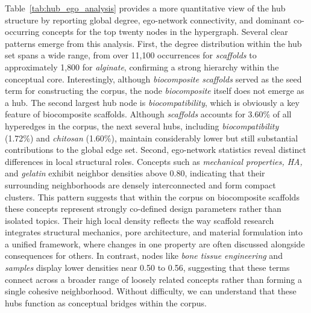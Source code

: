 \documentclass{article}
\begin{document}
Table~\ref{tab:hub_ego_analysis} provides a more quantitative view of the hub structure by reporting global degree, ego-network connectivity, and dominant co-occurring concepts for the top twenty nodes in the hypergraph. Several clear patterns emerge from this analysis. First, the degree distribution within the hub set spans a wide range, from over 11{,}100 occurrences for \textit{scaffolds} to approximately 1{,}800 for \textit{alginate}, confirming a strong hierarchy within the conceptual core. Interestingly, although \textit{biocomposite scaffolds} served as the seed term for constructing the corpus, the node \textit{biocomposite} itself does not emerge as a hub. The second largest hub node is \textit{biocompatibility}, which is obviously a key feature of biocomposite scaffolds. Although \textit{scaffolds} accounts for 3.60\% of all hyperedges in the corpus, the next several hubs, including \textit{biocompatibility} (1.72\%) and \textit{chitosan} (1.60\%), maintain considerably lower but still substantial contributions to the global edge set. Second, ego-network statistics reveal distinct differences in local structural roles. Concepts such as \textit{mechanical properties, HA, }and\textit{ gelatin} exhibit neighbor densities above 0.80, indicating that their surrounding neighborhoods are densely interconnected and form compact clusters. This pattern suggests that within the corpus on biocomposite scaffolds these concepts represent strongly co-defined design parameters rather than isolated topics. Their high local density reflects the way scaffold research integrates structural mechanics, pore architecture, and material formulation into a unified framework, where changes in one property are often discussed alongside consequences for others. In contrast, nodes like \textit{bone tissue engineering} and \textit{samples} display lower densities near 0.50 to 0.56, suggesting that these terms connect across a broader range of loosely related concepts rather than forming a single cohesive neighborhood. Without difficulty, we can understand that these hubs function as conceptual bridges within the corpus.
\end{document}
